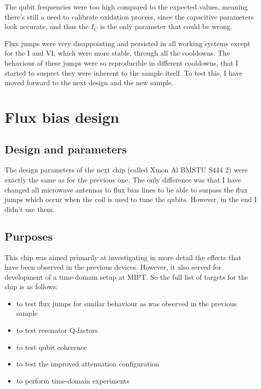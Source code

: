 \documentclass[12pt, twoside]{report}
\numberwithin{equation}{section}
\begin{document}
The qubit frequencies were too high compared to the expected values, meaning there's still a need to calibrate oxidation process, since the capacitive parameters look accurate, and thus the $I_C$ is the only parameter that could be wrong.

Flux jumps were very disappointing and persisted in all working systems except for the I and VI, which were more stable, through all the cooldowns. The behaviour of these jumps were so reproducible in different cooldowns, that I started to suspect they were inherent to the sample itself. To test this, I have moved forward to the next design and the new sample.

\newpage

\section{Flux bias design}

\subsection{Design and parameters}

The design parameters of the next chip (called Xmon Al BMSTU S444 2) were exactly the same as for the previous one. The only difference was that I have changed all microwave antennas to flux bias lines to be able to surpass the flux jumps which occur when the coil is used to tune the qubits. However, in the end I didn't use them.

\subsection{Purposes}

This chip was aimed primarily at investigating in more detail the effects that have been observed in the previous devices. However, it also served for development of a time-domain setup at MIPT. So the full list of targets for the chip is as follows:
\begin{itemize}
\item to test flux jumps for similar behaviour as was observed in the previous sample
\item to test resonator Q-factors
\item to test qubit coherence
\item to test the improved attenuation configuration
\item to perform time-domain experiments
\end{itemize}
\end{document}
